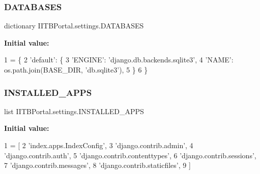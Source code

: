 \subsubsection{\texorpdfstring{D\+A\+T\+A\+B\+A\+S\+ES}{DATABASES}}
{\footnotesize\ttfamily dictionary I\+I\+T\+B\+Portal.\+settings.\+D\+A\+T\+A\+B\+A\+S\+ES}

{\bfseries Initial value\+:}
\begin{DoxyCode}
1 =  \{
2     \textcolor{stringliteral}{'default'}: \{
3         \textcolor{stringliteral}{'ENGINE'}: \textcolor{stringliteral}{'django.db.backends.sqlite3'},
4         \textcolor{stringliteral}{'NAME'}: os.path.join(BASE\_DIR, \textcolor{stringliteral}{'db.sqlite3'}),
5     \}
6 \}
\end{DoxyCode}
\mbox{\label{namespaceIITBPortal_1_1settings_a34d03dba41f04113939819a8f393917b}} 
\subsubsection{\texorpdfstring{I\+N\+S\+T\+A\+L\+L\+E\+D\+\_\+\+A\+P\+PS}{INSTALLED\_APPS}}
{\footnotesize\ttfamily list I\+I\+T\+B\+Portal.\+settings.\+I\+N\+S\+T\+A\+L\+L\+E\+D\+\_\+\+A\+P\+PS}

{\bfseries Initial value\+:}
\begin{DoxyCode}
1 =  [
2     \textcolor{stringliteral}{'index.apps.IndexConfig'},
3     \textcolor{stringliteral}{'django.contrib.admin'},
4     \textcolor{stringliteral}{'django.contrib.auth'},
5     \textcolor{stringliteral}{'django.contrib.contenttypes'},
6     \textcolor{stringliteral}{'django.contrib.sessions'},
7     \textcolor{stringliteral}{'django.contrib.messages'},
8     \textcolor{stringliteral}{'django.contrib.staticfiles'},
9 ]
\end{DoxyCode}
\mbox{\label{namespaceIITBPortal_1_1settings_a9d8f99d370e1302bfa0c1e52f1d77acd}} 
